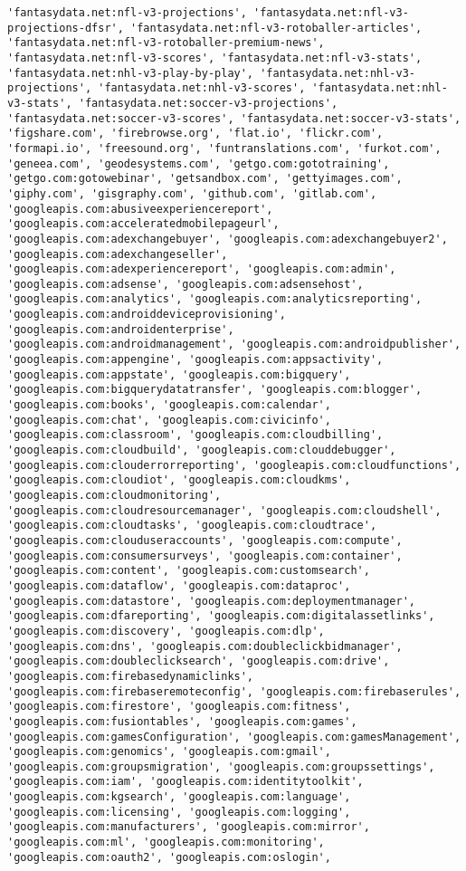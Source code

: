 \documentclass[11pt]{article}
\begin{document}
\begin{Verbatim}[commandchars=\\\{\}]
'fantasydata.net:nfl-v3-projections', 'fantasydata.net:nfl-v3-projections-dfsr', 'fantasydata.net:nfl-v3-rotoballer-articles', 'fantasydata.net:nfl-v3-rotoballer-premium-news', 'fantasydata.net:nfl-v3-scores', 'fantasydata.net:nfl-v3-stats', 'fantasydata.net:nhl-v3-play-by-play', 'fantasydata.net:nhl-v3-projections', 'fantasydata.net:nhl-v3-scores', 'fantasydata.net:nhl-v3-stats', 'fantasydata.net:soccer-v3-projections', 'fantasydata.net:soccer-v3-scores', 'fantasydata.net:soccer-v3-stats', 'figshare.com', 'firebrowse.org', 'flat.io', 'flickr.com', 'formapi.io', 'freesound.org', 'funtranslations.com', 'furkot.com', 'geneea.com', 'geodesystems.com', 'getgo.com:gototraining', 'getgo.com:gotowebinar', 'getsandbox.com', 'gettyimages.com', 'giphy.com', 'gisgraphy.com', 'github.com', 'gitlab.com', 'googleapis.com:abusiveexperiencereport', 'googleapis.com:acceleratedmobilepageurl', 'googleapis.com:adexchangebuyer', 'googleapis.com:adexchangebuyer2', 'googleapis.com:adexchangeseller', 'googleapis.com:adexperiencereport', 'googleapis.com:admin', 'googleapis.com:adsense', 'googleapis.com:adsensehost', 'googleapis.com:analytics', 'googleapis.com:analyticsreporting', 'googleapis.com:androiddeviceprovisioning', 'googleapis.com:androidenterprise', 'googleapis.com:androidmanagement', 'googleapis.com:androidpublisher', 'googleapis.com:appengine', 'googleapis.com:appsactivity', 'googleapis.com:appstate', 'googleapis.com:bigquery', 'googleapis.com:bigquerydatatransfer', 'googleapis.com:blogger', 'googleapis.com:books', 'googleapis.com:calendar', 'googleapis.com:chat', 'googleapis.com:civicinfo', 'googleapis.com:classroom', 'googleapis.com:cloudbilling', 'googleapis.com:cloudbuild', 'googleapis.com:clouddebugger', 'googleapis.com:clouderrorreporting', 'googleapis.com:cloudfunctions', 'googleapis.com:cloudiot', 'googleapis.com:cloudkms', 'googleapis.com:cloudmonitoring', 'googleapis.com:cloudresourcemanager', 'googleapis.com:cloudshell', 'googleapis.com:cloudtasks', 'googleapis.com:cloudtrace', 'googleapis.com:clouduseraccounts', 'googleapis.com:compute', 'googleapis.com:consumersurveys', 'googleapis.com:container', 'googleapis.com:content', 'googleapis.com:customsearch', 'googleapis.com:dataflow', 'googleapis.com:dataproc', 'googleapis.com:datastore', 'googleapis.com:deploymentmanager', 'googleapis.com:dfareporting', 'googleapis.com:digitalassetlinks', 'googleapis.com:discovery', 'googleapis.com:dlp', 'googleapis.com:dns', 'googleapis.com:doubleclickbidmanager', 'googleapis.com:doubleclicksearch', 'googleapis.com:drive', 'googleapis.com:firebasedynamiclinks', 'googleapis.com:firebaseremoteconfig', 'googleapis.com:firebaserules', 'googleapis.com:firestore', 'googleapis.com:fitness', 'googleapis.com:fusiontables', 'googleapis.com:games', 'googleapis.com:gamesConfiguration', 'googleapis.com:gamesManagement', 'googleapis.com:genomics', 'googleapis.com:gmail', 'googleapis.com:groupsmigration', 'googleapis.com:groupssettings', 'googleapis.com:iam', 'googleapis.com:identitytoolkit', 'googleapis.com:kgsearch', 'googleapis.com:language', 'googleapis.com:licensing', 'googleapis.com:logging', 'googleapis.com:manufacturers', 'googleapis.com:mirror', 'googleapis.com:ml', 'googleapis.com:monitoring', 'googleapis.com:oauth2', 'googleapis.com:oslogin', 
\end{Verbatim}
\end{document}
